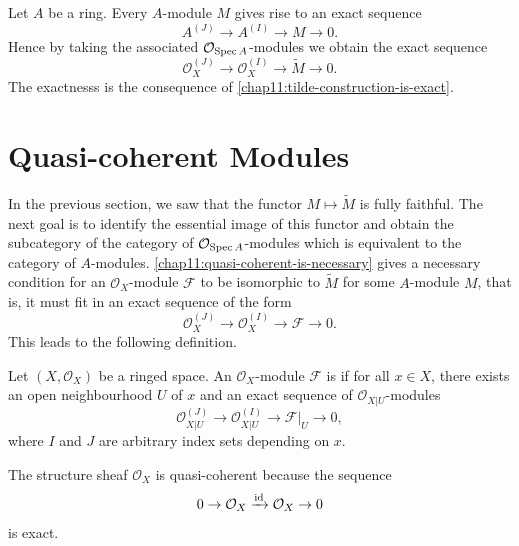 \begin{remark}\label{chap11:quasi-coherent-is-necessary}
	Let $A$ be a ring. Every $A$-module $M$ gives rise to an exact sequence
	\begin{equation*}
		A^{(J)} \rightarrow A^{(I)} \rightarrow M \rightarrow 0.
	\end{equation*}
	Hence by taking the associated $\mathcal{O}_{\operatorname{Spec} A}$-modules we obtain the exact sequence
	\begin{equation*}
		\mathcal{O}_{X}^{(J)} \rightarrow \mathcal{O}_{X}^{(I)} \rightarrow \tilde{M} \rightarrow 0.
	\end{equation*}
	The exactnesss is the consequence of \cref{chap11:tilde-construction-is-exact}.
\end{remark}

\section{Quasi-coherent Modules}

In the previous section, we saw that the functor $M \mapsto \tilde{M}$ is fully faithful. The next goal is to identify the essential image of this functor and obtain the subcategory of the category of $\mathcal{O}_{\operatorname{Spec} A}$-modules which is equivalent to the category of $A$-modules. \cref{chap11:quasi-coherent-is-necessary} gives a necessary condition for an $\mathcal{O}_X$-module $\mathcal{F}$ to be isomorphic to $\tilde{M}$ for some $A$-module $M$, that is, it must fit in an exact sequence of the form
\begin{equation*}
	\mathcal{O}_{X}^{(J)} \rightarrow \mathcal{O}_{X}^{(I)} \rightarrow \mathcal{F} \rightarrow 0.
\end{equation*}
This leads to the following definition.

\begin{definition}
	Let $(X, \mathcal{O}_X)$ be a ringed space. An $\mathcal{O}_X$-module $\mathcal{F}$ is  if for all $x \in X$, there exists an open neighbourhood $U$ of $x$ and an exact sequence of $\mathcal{O}_{X|U}$-modules
	\begin{equation*}
		\mathcal{O}_{X|U}^{(J)} \longrightarrow \mathcal{O}_{X|U}^{(I)} \longrightarrow \mathcal{F}|_{U} \to 0,
	\end{equation*}
	where $I$ and $J$ are arbitrary index sets depending on $x$.
\end{definition}

\begin{example}
	The structure sheaf $\mathcal{O}_X$ is quasi-coherent because the sequence
	\begin{equation*}
		0 \to \mathcal{O}_X \xrightarrow{\operatorname{id}} \mathcal{O}_X \to 0
	\end{equation*}
	is exact.
\end{example}

